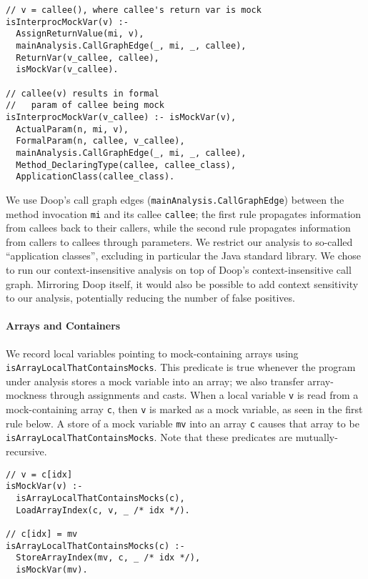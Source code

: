 \begin{lstlisting}[basicstyle=\ttfamily\small,numbers=none,caption={Two rules give interprocedural analysis in Doop.},
basicstyle=\scriptsize\ttfamily, framesep=4.5mm, framexleftmargin=1.0mm, captionpos=b, label=lis:interproc-rule, escapechar=!]
// v = callee(), where callee's return var is mock
isInterprocMockVar(v) :-
  AssignReturnValue(mi, v),
  mainAnalysis.CallGraphEdge(_, mi, _, callee),
  ReturnVar(v_callee, callee),
  isMockVar(v_callee).

// callee(v) results in formal
//   param of callee being mock
isInterprocMockVar(v_callee) :- isMockVar(v),
  ActualParam(n, mi, v),
  FormalParam(n, callee, v_callee),
  mainAnalysis.CallGraphEdge(_, mi, _, callee),
  Method_DeclaringType(callee, callee_class),
  ApplicationClass(callee_class).
\end{lstlisting}
We use Doop's call graph edges (\texttt{mainAnalysis.CallGraphEdge}) between the method invocation {\tt mi} and its callee {\tt callee}; the first rule propagates information from callees back to their callers, while the second rule propagates information from callers to callees through parameters. We restrict our analysis to so-called ``application classes'', excluding in particular the Java standard library. We chose to run our context-insensitive analysis on top of Doop's context-insensitive call graph. Mirroring Doop itself, it would also be possible to add context sensitivity to our analysis, potentially reducing the number of false positives.%
\paragraph{Arrays and Containers} We record local variables pointing to mock-containing arrays using  {\tt isArrayLocalThatContainsMocks}. This predicate is true whenever the program under analysis stores a mock variable into an array; we also transfer array-mockness through assignments and casts. When a local variable \texttt{v} is read from a mock-containing array \texttt{c}, then \texttt{v} is marked as a mock variable, as seen in the first rule below. A store of a mock variable \texttt{mv} into an array \texttt{c} causes that array to be \texttt{isArrayLocalThatContainsMocks}. Note that these predicates are mutually-recursive. 

\begin{lstlisting}[basicstyle=\ttfamily\small,numbers=none,caption={Rules for handling arrays.},
basicstyle=\scriptsize\ttfamily, framesep=4.5mm, framexleftmargin=1.0mm, captionpos=b, label=lis:array-rule, escapechar=!]
// v = c[idx]
isMockVar(v) :-
  isArrayLocalThatContainsMocks(c),
  LoadArrayIndex(c, v, _ /* idx */).

// c[idx] = mv
isArrayLocalThatContainsMocks(c) :-
  StoreArrayIndex(mv, c, _ /* idx */),
  isMockVar(mv).
\end{lstlisting}

